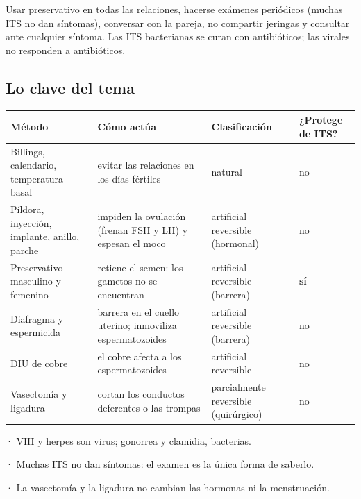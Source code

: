 \begin{clave}[{Prevención}] Usar preservativo en todas las relaciones, hacerse exámenes periódicos (muchas ITS no dan síntomas), conversar con la pareja, no compartir jeringas y consultar ante cualquier síntoma. Las ITS bacterianas se curan con antibióticos; las virales no responden a antibióticos.\end{clave}
\subsection{Lo clave del tema}
\begin{center}\small
\begin{tabularx}{\linewidth}{@{}>{\raggedright\arraybackslash\hsize=1.21\hsize}X>{\raggedright\arraybackslash\hsize=1.21\hsize}X>{\raggedright\arraybackslash\hsize=1.09\hsize}X>{\raggedright\arraybackslash\hsize=0.48\hsize}X@{}}
\toprule
\textbf{Método} & \textbf{Cómo actúa} & \textbf{Clasificación} & \textbf{¿Protege de ITS?} \\
\midrule
Billings, calendario, temperatura basal & evitar las relaciones en los días fértiles & natural & no \\
Píldora, inyección, implante, anillo, parche & impiden la ovulación (frenan FSH y LH) y espesan el moco & artificial reversible (hormonal) & no \\
Preservativo masculino y femenino & retiene el semen: los gametos no se encuentran & artificial reversible (barrera) & \textbf{sí} \\
Diafragma y espermicida & barrera en el cuello uterino; inmoviliza espermatozoides & artificial reversible (barrera) & no \\
DIU de cobre & el cobre afecta a los espermatozoides & artificial reversible & no \\
Vasectomía y ligadura & cortan los conductos deferentes o las trompas & parcialmente reversible (quirúrgico) & no \\
\bottomrule
\end{tabularx}
\end{center}
 
\begin{clave}[{Recuerda}] · VIH y herpes son virus; gonorrea y clamidia, bacterias.\par · Muchas ITS no dan síntomas: el examen es la única forma de saberlo.\par · La vasectomía y la ligadura no cambian las hormonas ni la menstruación.\end{clave}
 
